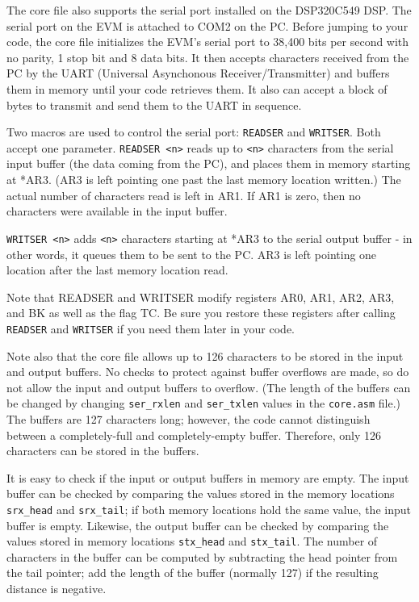 The core file also supports the serial port installed on the
DSP320C549 DSP. The serial port on the EVM is attached to COM2 on
the PC.  Before jumping to your code, the core file initializes
the EVM's serial port to 38,400 bits per second with no parity, 1 stop bit
and 8 data bits. It then accepts characters received from the PC by
the UART (Universal Asynchonous Receiver/Transmitter) and buffers them
in memory until your code retrieves them. It also can accept a block of
bytes to transmit and send them to the UART in sequence.

Two macros are used to control the serial port: \verb+READSER+ and
\verb+WRITSER+.  Both accept one parameter. \verb+READSER <n>+ reads up
to \verb+<n>+ characters from the serial input buffer (the data coming
from the PC), and places them in memory starting at *AR3. (AR3 is left
pointing one past the last memory location written.) The actual number
of characters read is left in AR1. If AR1 is zero, then no characters
were available in the input buffer.

\verb+WRITSER <n>+ adds \verb+<n>+ characters starting at *AR3 to the
serial output buffer - in other words, it queues them to be sent to the
PC. AR3 is left pointing one location after the last memory location read.

Note that READSER and WRITSER modify registers AR0, AR1, AR2, AR3, and
BK as well as the flag TC. Be sure you restore these registers after
calling \verb+READSER+ and \verb+WRITSER+ if you need them later in
your code.

Note also that the core file allows up to 126 characters to
be stored in the input and output buffers. No checks to protect against
buffer overflows are made, so do not allow the input and output buffers
to overflow. (The length of the buffers can be changed by changing
\verb+ser_rxlen+ and \verb+ser_txlen+ values in the \verb+core.asm+
file.) The buffers are 127 characters long; however, the code
cannot distinguish between a completely-full and completely-empty
buffer. Therefore, only 126 characters can be stored in the buffers.


It is easy to check if the input or output buffers in memory are
empty. The input buffer can be checked by comparing the values stored in
the memory locations \verb+srx_head+ and \verb+srx_tail+; if both memory
locations hold the same value, the input buffer is empty. Likewise, the
output buffer can be checked by comparing the values stored in memory
locations \verb+stx_head+ and \verb+stx_tail+. The number of characters in
the buffer can be computed by subtracting the head pointer from the tail
pointer; add the length of the buffer (normally 127) if the resulting
distance is negative.

